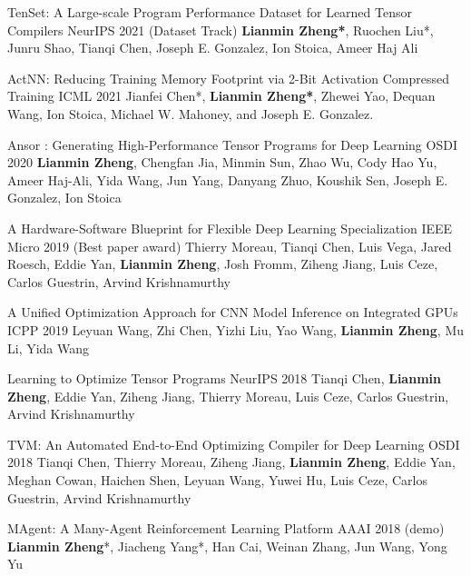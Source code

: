 
\begin{cventries}

\cventry
{}
{TenSet: A Large-scale Program Performance Dataset for Learned Tensor Compilers} %
{NeurIPS 2021 (Dataset Track)} %
{} %
{\textbf{Lianmin Zheng*}, Ruochen Liu*, Junru Shao, Tianqi Chen, Joseph E. Gonzalez, Ion Stoica, Ameer Haj Ali}

\cventry
{}
{ActNN: Reducing Training Memory Footprint via 2-Bit Activation Compressed Training} %
{ICML 2021} %
{} %
{Jianfei Chen*, \textbf{Lianmin Zheng*}, Zhewei Yao, Dequan Wang, Ion Stoica, Michael W. Mahoney, and Joseph E. Gonzalez.}

\cventry
{}
{Ansor : Generating High-Performance Tensor Programs for Deep Learning} %
{OSDI 2020} %
{} %
{\textbf{Lianmin Zheng}, Chengfan Jia, Minmin Sun, Zhao Wu, Cody Hao Yu, Ameer Haj-Ali, Yida Wang, Jun Yang, Danyang Zhuo, Koushik Sen, Joseph E. Gonzalez, Ion Stoica}

\cventry
{}
{A Hardware-Software Blueprint for Flexible Deep Learning Specialization} %
{IEEE Micro 2019 (Best paper award)} %
{} %
{Thierry Moreau, Tianqi Chen, Luis Vega, Jared Roesch, Eddie Yan, \textbf{Lianmin Zheng}, Josh Fromm, Ziheng Jiang, Luis Ceze, Carlos Guestrin, Arvind Krishnamurthy}

\cventry
{}
{A Unified Optimization Approach for CNN Model Inference on Integrated GPUs} %
{ICPP 2019} %
{} %
{Leyuan Wang, Zhi Chen, Yizhi Liu, Yao Wang, \textbf{Lianmin Zheng}, Mu Li, Yida Wang}

\cventry
{}
{Learning to Optimize Tensor Programs} %
{NeurIPS 2018} %
{} %
{Tianqi Chen, \textbf{Lianmin Zheng}, Eddie Yan, Ziheng Jiang, Thierry Moreau, Luis Ceze, Carlos Guestrin, Arvind Krishnamurthy}

\cventry
{}
{TVM: An Automated End-to-End Optimizing Compiler for Deep Learning} %
{OSDI 2018} %
{} %
{Tianqi Chen, Thierry Moreau, Ziheng Jiang, \textbf{Lianmin Zheng}, Eddie Yan, Meghan Cowan, Haichen Shen, Leyuan Wang, Yuwei Hu, Luis Ceze, Carlos Guestrin, Arvind Krishnamurthy}

\cventry
{}
{MAgent: A Many-Agent Reinforcement Learning Platform} %
{AAAI 2018 (demo)} %
{} %
{\textbf{Lianmin Zheng}*, Jiacheng Yang*, Han Cai, Weinan Zhang, Jun Wang, Yong Yu}

\end{cventries}